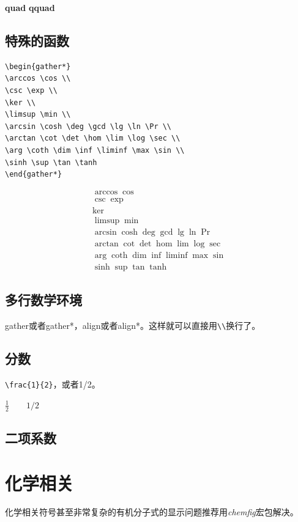 \documentclass[12pt,oneside]{book}
\begin{document}
\begin{common-format}
\textbf{quad}  \textbf{qquad}


\section{特殊的函数}
\begin{Verbatim}
\begin{gather*}
\arccos \cos \\
\csc \exp \\
\ker \\
\limsup \min \\ 
\arcsin \cosh \deg \gcd \lg \ln \Pr \\ 
\arctan \cot \det \hom \lim \log \sec \\
\arg \coth \dim \inf \liminf \max \sin \\
\sinh \sup \tan \tanh
\end{gather*}
\end{Verbatim}

\begin{gather*}
\arccos \cos \\
\csc \exp \\
\ker \\
\limsup \min \\ 
\arcsin \cosh \deg \gcd \lg \ln \Pr \\ 
\arctan \cot \det \hom \lim \log \sec \\
\arg \coth \dim \inf \liminf \max \sin \\
\sinh \sup \tan \tanh
\end{gather*}

\section{多行数学环境}
gather或者gather*，align或者align*。这样就可以直接用\verb+\\+换行了。

\section{分数}
\verb+\frac{1}{2}+，或者1/2。

$\frac{1}{2} \qquad 1/2$

\section{二项系数}



\chapter{化学相关}
化学相关符号甚至非常复杂的有机分子式的显示问题推荐用\emph{chemfig}宏包解决。


\end{common-format}
\end{document}

